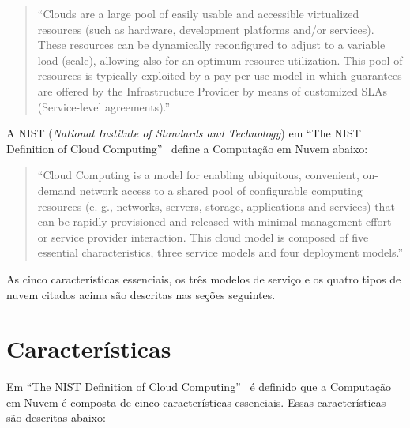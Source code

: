 	\begin{quotation}
		``Clouds are a large pool of easily usable and accessible virtualized resources (such as hardware, development platforms and/or services). These resources can be dynamically reconfigured to adjust to a variable load (scale), allowing also for an optimum resource utilization. This pool of resources is typically exploited by a pay-per-use model in which guarantees are offered by the Infrastructure Provider by means of customized SLAs (Service-level agreements).''
	\end{quotation}
	
	A NIST (\emph{National Institute of Standards and Technology}) em ``The NIST Definition of Cloud Computing''~\citeyearpar{NIST:2011} define a Computação em Nuvem abaixo:
	
	\begin{quotation}
		``Cloud Computing is a model for enabling ubiquitous, convenient, on-demand network access to a shared pool of configurable computing resources (e. g., networks, servers,             storage, applications and services) that can be rapidly provisioned and released with minimal management effort or service provider interaction. This cloud model is composed of five essential characteristics, three service models and four deployment models.''
	\end{quotation}	
	
	As cinco características essenciais, os três modelos de serviço e os quatro tipos de nuvem citados acima são descritas nas seções seguintes.		

\section{Características} \label{cloud:char}
	Em ``The NIST Definition of Cloud Computing''~\citeyearpar{NIST:2011} é definido que a Computação em Nuvem é composta de cinco características essenciais. Essas características são descritas abaixo:   

